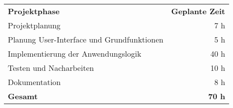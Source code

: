 \begin{tabular}{lr}
	\rowcolor{heading}\textbf{Projektphase} & \textbf{Geplante Zeit} \\
	Projektplanung & 7 h \\
	\rowcolor{odd}Planung User-Interface und Grundfunktionen & 5 h \\
	Implementierung der Anwendungslogik & 40 h \\
	\rowcolor{odd}Testen und Nacharbeiten & 10 h \\
	Dokumentation & 8 h \\
	\hline
	\hline
	\rowcolor{odd}\textbf{Gesamt} & \textbf{70 h} \\
\end{tabular}